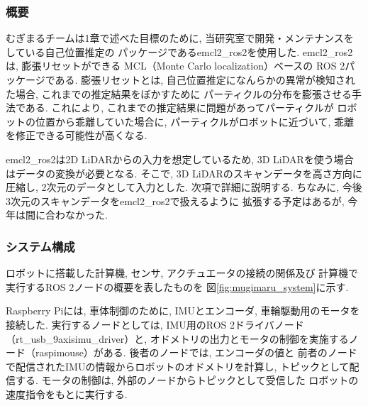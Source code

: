 \subsubsection{概要}
むぎまるチームは1章で述べた目標のために, 
当研究室で開発・メンテナンスをしている自己位置推定の
パッケージであるemcl2\_ros2\cite{emcl2_ros2}を使用した. 
emcl2\_ros2は, 膨張リセット\cite{ueda2004iros}ができる
MCL（Monte Carlo localization\cite{fox1999etal}）ベースの
ROS 2パッケージである. 
膨張リセットとは, 
自己位置推定になんらかの異常が検知された場合, 
これまでの推定結果をぼかすために
パーティクルの分布を膨張させる手法である. 
これにより, これまでの推定結果に問題があってパーティクルが
ロボットの位置から乖離していた場合に, 
パーティクルがロボットに近づいて, 
乖離を修正できる可能性が高くなる. 


emcl2\_ros2は2D LiDARからの入力を想定しているため, 
3D LiDARを使う場合はデータの変換が必要となる. 
そこで, 3D LiDARのスキャンデータを高さ方向に圧縮し, 
2次元のデータとして入力とした. 
次項で詳細に説明する. 
ちなみに, 
今後3次元のスキャンデータをemcl2\_ros2で扱えるように
拡張する予定はあるが, 今年は間に合わなかった. 

\subsubsection{システム構成}
ロボットに搭載した計算機, センサ, アクチュエータの接続の関係及び
計算機で実行するROS 2ノードの概要を表したものを
図\ref{fig:mugimaru_system}に示す. 

Raspberry Piには, 車体制御のために, IMUとエンコーダ, 車輪駆動用のモータを接続した. 
実行するノードとしては, IMU用のROS 2ドライバノード（rt\_usb\_9axisimu\_driver）と, 
オドメトリの出力とモータの制御を実施するノード（raspimouse）がある. 
後者のノードでは, エンコーダの値と
前者のノードで配信されたIMUの情報からロボットのオドメトリを計算し, 
トピックとして配信する. 
モータの制御は, 外部のノードからトピックとして受信した
ロボットの速度指令をもとに実行する. 

